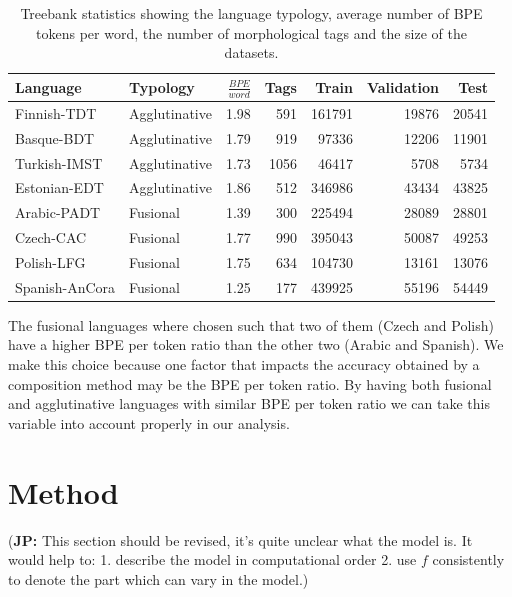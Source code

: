 \documentclass[11pt]{article}
\newcommand\jp[1]{(\textbf{JP:} #1)}
\begin{document}
    	\begin{table} %
		\centering
		\begin{tabular}{l|lrrrrr}
			Language & Typology & $\frac{BPE}{word}$ & Tags & Train & Validation & Test \\
			\hline
			Finnish-TDT     & Agglutinative & 1.98 & 591 & 161791 & 19876 & 20541 \\
			Basque-BDT      & Agglutinative & 1.79 & 919 & 97336 & 12206 & 11901 \\
			Turkish-IMST    & Agglutinative & 1.73 & 1056 & 46417 & 5708 & 5734 \\
			Estonian-EDT    & Agglutinative & 1.86 & 512 & 346986 & 43434 & 43825 \\
            Arabic-PADT     & Fusional & 1.39 & 300 & 225494 & 28089 & 28801  \\
			Czech-CAC       & Fusional & 1.77 & 990 & 395043 & 50087 & 49253 \\
			Polish-LFG      & Fusional & 1.75 & 634 & 104730 & 13161 & 13076 \\
			Spanish-AnCora  & Fusional & 1.25 & 177 & 439925 & 55196 & 54449 \\
        \end{tabular}
		\caption{\label{tab:data} Treebank statistics showing the language typology, average number of BPE tokens per word, the number of morphological tags and the size of the datasets.}
	\end{table}
    
        The fusional languages where chosen such that two of them
        (Czech and Polish) have a higher BPE per token ratio than the
        other two (Arabic and Spanish). We make this choice because
        one factor that impacts the accuracy obtained by a composition
        method may be the BPE per token ratio.  By having both
        fusional and agglutinative languages with similar BPE per
        token ratio we can take this variable into account properly in
        our analysis.

	\section{Method}
	\label{method}
        \jp{This section should be revised, it's quite unclear what
          the model is. It would help to: 1. describe the model in
          computational order 2. use $f$ consistently to denote the
          part which can vary in the model.}
        
\end{document}
